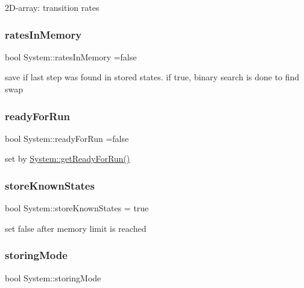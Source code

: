 2\+D-\/array\+: transition rates \mbox{\label{classSystem_abdb9c2321ac8dbfc6a5febc07ae4def9}} 
\subsubsection{\texorpdfstring{rates\+In\+Memory}{ratesInMemory}}
{\footnotesize\ttfamily bool System\+::rates\+In\+Memory =false\hspace{0.3cm}{\ttfamily [private]}}

save if last step was found in stored states. if true, binary search is done to find swap \mbox{\label{classSystem_a0d59e20f6ebffb9b2b6e31f7e85d1756}} 
\subsubsection{\texorpdfstring{ready\+For\+Run}{readyForRun}}
{\footnotesize\ttfamily bool System\+::ready\+For\+Run =false\hspace{0.3cm}{\ttfamily [private]}}

set by \hyperlink{classSystem_a943bc42d8dc42ae1aaf1a5798ce723b8}{System\+::get\+Ready\+For\+Run()} \mbox{\label{classSystem_aa121c1c34382800d39106aa81d9c36f4}} 
\subsubsection{\texorpdfstring{store\+Known\+States}{storeKnownStates}}
{\footnotesize\ttfamily bool System\+::store\+Known\+States = true\hspace{0.3cm}{\ttfamily [private]}}

set false after memory limit is reached \mbox{\label{classSystem_afe51eb9409a63748242e0a987c98caf0}} 
\subsubsection{\texorpdfstring{storing\+Mode}{storingMode}}
{\footnotesize\ttfamily bool System\+::storing\+Mode\hspace{0.3cm}{\ttfamily [private]}}

